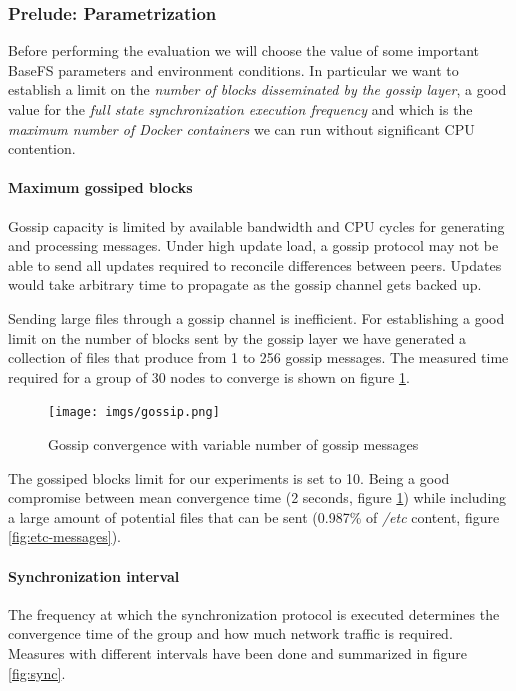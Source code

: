 \documentclass{sig-alternate}
\begin{document}
\subsubsection{Prelude: Parametrization}

Before performing the evaluation we will choose the value of some important BaseFS parameters and environment conditions. In particular we want to establish a limit on the \textit{number of blocks disseminated by the gossip layer}, a good value for the \textit{full state synchronization execution frequency} and which is the \textit{maximum number of Docker containers} we can run without significant CPU contention.


\paragraph{Maximum gossiped blocks}

Gossip capacity is limited by available bandwidth and CPU cycles for generating and processing messages. Under high update load, a gossip protocol may not be able to send all updates required to reconcile differences between peers. Updates would take arbitrary time to propagate as the gossip channel gets backed up. \cite{van2008efficient}

Sending large files through a gossip channel is inefficient. For establishing a good limit on the number of blocks sent by the gossip layer we have generated a collection of files that produce from 1 to 256 gossip messages. The measured time required for a group of 30 nodes to converge is shown on figure \ref{fig:gossip}.

\begin{figure}
\centering
\texttt{[image: imgs/gossip.png]}
\caption{Gossip convergence with variable number of gossip messages}
\label{fig:gossip}
\end{figure}

The gossiped blocks limit for our experiments is set to 10. Being a good compromise between mean convergence time (2 seconds, figure \ref{fig:gossip}) while including a large amount of potential files that can be sent (0.987\% of \textit{/etc} content, figure   \ref{fig:etc-messages}).


\paragraph{Synchronization interval}

The frequency at which the synchronization protocol is executed determines the convergence time of the group and how much network traffic is required. Measures with different intervals have been done and summarized in figure \ref{fig:sync}.
\end{document}
